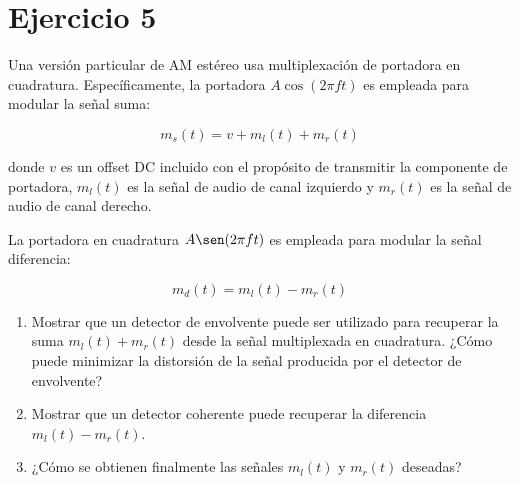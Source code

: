 \section{Ejercicio 5}

Una versión particular de AM estéreo usa multiplexación de portadora en cuadratura. Específicamente, la portadora $A \cos(2 \pi f t)$ es empleada para modular la señal suma:

\[
m_s(t) = v + m_l(t) + m_r(t)
\]

donde $v$ es un offset DC incluido con el propósito de transmitir la componente de portadora, $m_l(t)$ es la señal de audio de canal izquierdo y $m_r(t)$ es la señal de audio de canal derecho.

La portadora en cuadratura $A \sen(2 \pi f t)$ es empleada para modular la señal diferencia:

\[
m_d(t) = m_l(t) - m_r(t)
\]

\begin{enumerate}[label=\alph*)]
    \item Mostrar que un detector de envolvente puede ser utilizado para recuperar la suma $m_l(t) + m_r(t)$ desde la señal multiplexada en cuadratura. ¿Cómo puede minimizar la distorsión de la señal producida por el detector de envolvente?
    \item Mostrar que un detector coherente puede recuperar la diferencia $m_l(t) - m_r(t)$.
    \item ¿Cómo se obtienen finalmente las señales $m_l(t)$ y $m_r(t)$ deseadas?
\end{enumerate}
